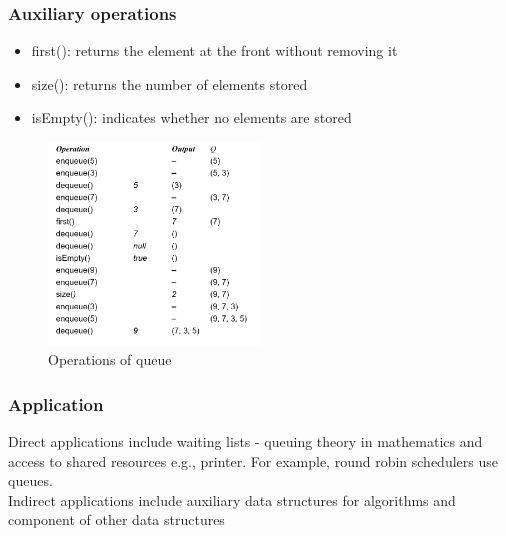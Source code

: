 \documentclass[a4paper]{article}
\theoremstyle{plain}
\theoremstyle{definition}
\newtheorem{exmp}{Example}[section]
\theoremstyle{remark}
\begin{document}
\subsubsection{Auxiliary operations}
\begin{itemize}
	\item first(): returns the element at the front without removing it
	\item size(): returns the number of elements stored
	\item isEmpty(): indicates whether no elements are stored
\end{itemize}
\begin{tcolorbox}[colback=black!3!white,colframe=black!60!white,title=\begin{exmp}Operations \label{Operations}\end{exmp}]
        \begin{figure}[H]
        	\centering
        	\includegraphics[width=0.5\textwidth]{figures/queue.png}
        	\caption{Operations of queue}
        	\label{fig:figures-queue-png}
        \end{figure}
\end{tcolorbox}
\subsubsection{Application}
Direct applications include waiting lists - queuing theory in mathematics and access to shared resources e.g., printer. For example, round robin schedulers use queues. \\
Indirect applications include auxiliary data structures for algorithms and component of other data structures
\end{document}
